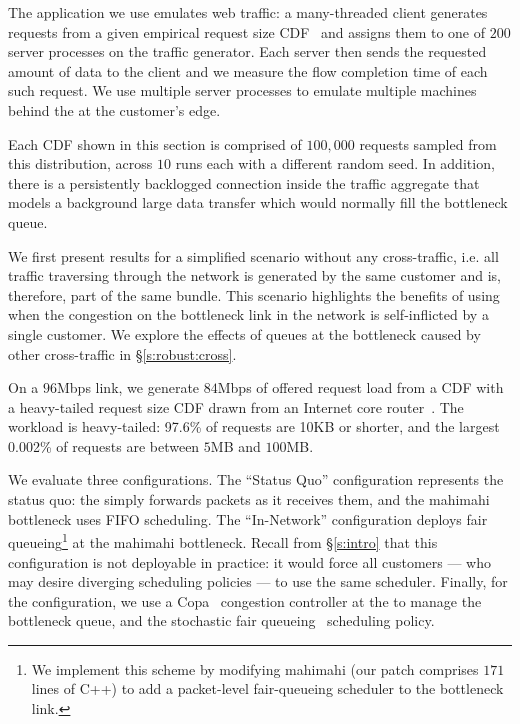 The application we use emulates web traffic: a many-threaded client generates requests from a given empirical request size CDF~\cite{caida-dataset} and assigns them to one of $200$ server processes on the traffic generator.
Each server then sends the requested amount of data to the client and
we measure the flow completion time of each such request.
We use multiple server processes to emulate multiple machines behind the \name at the customer's edge.

Each CDF shown in this section is comprised of $100,000$ requests sampled from this distribution, across $10$ runs each with a different random seed.
In addition, there is a persistently backlogged connection inside the traffic aggregate that models a background large data transfer which would normally fill the bottleneck queue.
%
%


\newcommand{\baseline}{Status Quo\xspace}
\newcommand{\optimal}{In-Network\xspace}
\paragrapha{Comparison with \baseline and \optimal Scheduling} 
We first present results for a simplified scenario without any cross-traffic, i.e. all traffic traversing through the network is generated by the same customer and is, therefore, part of the same bundle. 
This scenario highlights the benefits of using \name when the congestion on the bottleneck link in the network is self-inflicted by a single customer. We explore the effects of queues at the bottleneck caused by other cross-traffic in \S\ref{s:robust:cross}.

On a $96$Mbps link, we generate $84$Mbps of offered request load from a CDF with a heavy-tailed request size CDF drawn from an Internet core router~\cite{caida-dataset}.
The workload is heavy-tailed: 97.6\% of requests are 10KB or shorter, and the largest 0.002\% of requests are between $5$MB and $100$MB.

We evaluate three configurations. 
The ``\baseline'' configuration represents the status quo: the \inbox simply forwards packets as it receives them, and the mahimahi bottleneck uses FIFO scheduling.
The ``\optimal'' configuration deploys fair queueing\footnote{
We implement this scheme by modifying mahimahi (our patch comprises $171$ lines of C++) to add a packet-level fair-queueing scheduler to the bottleneck link.}
at the mahimahi bottleneck. 
Recall from \S\ref{s:intro} that this configuration is not deployable in practice: it would force all customers --- who may desire diverging scheduling policies --- to use the same scheduler.
Finally, for the \name configuration, we use a Copa~\cite{copa} congestion controller at the \inbox to manage the bottleneck queue, and the stochastic fair queueing~\cite{sfq} scheduling policy. 

